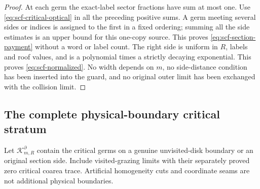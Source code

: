 \begin{proof}
At each germ the exact-label sector fractions have sum at most one.
Use \eqref{eq:scf-critical-optical} in all the preceding positive
sums. A germ meeting several sides or indices is assigned to the
first in a fixed ordering; summing all the side estimates is an
upper bound for this one-copy source. This proves
\eqref{eq:scf-section-payment} without a word or label count.
The right side is uniform in $R$, labels and roof values, and is
a polynomial times a strictly decaying exponential.
This proves \eqref{eq:scf-normalized}. No width depends on $m$,
no side-distance condition has been inserted into the guard, and
no original outer limit has been exchanged with the collision limit.
\end{proof}

\subsection{The complete physical-boundary critical stratum}

Let $\mathcal K^\partial_{m,R}$ contain the critical germs on a
genuine unvisited-disk boundary or an original section side.
Include visited-grazing limits with their separately proved zero
critical coarea trace. Artificial homogeneity cuts and coordinate
seams are not additional physical boundaries.

